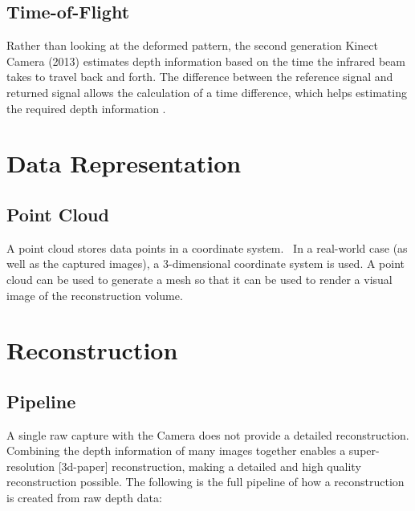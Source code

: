 \documentclass[11pt,openright,a4paper]{report}
\begin{document}
\subsection{Time-of-Flight}
Rather than looking at the deformed pattern, the second generation Kinect Camera (2013) estimates depth information based on the time the infrared beam takes to travel back and forth. The difference between the reference signal and returned signal allows the calculation of a time difference, which helps estimating the required depth information \cite{chi-book}.  

\section{Data Representation}

\subsection{Point Cloud}
A point cloud stores data points in a coordinate system.~\cite{chi-book} In a real-world case (as well as the captured images), a 3-dimensional coordinate system is used. A point cloud can be used to generate a mesh so that it can be used to render a visual image of the reconstruction volume.

\section{Reconstruction}

\subsection{Pipeline}
A single raw capture with the Camera does not provide a detailed reconstruction. Combining the depth information of many images together enables a super-resolution [3d-paper] reconstruction, making a detailed and high quality reconstruction possible. The following is the full pipeline of how a reconstruction is created from raw depth data:
\end{document}
